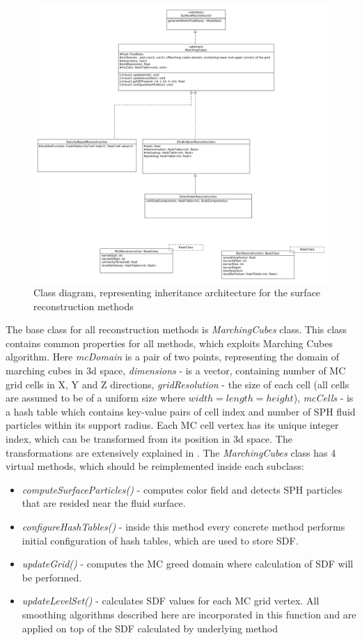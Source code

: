 \begin{figure}[H]
	\begin{center}
		\includegraphics[width=\textwidth]{figures/ClassDiagram.png}
	\end{center}
	\caption{Class diagram, representing inheritance architecture for the surface reconstruction methods}
    \label{fig:class-diagam}
\end{figure}
The base class for all reconstruction methods is \emph{MarchingCubes} class. This class contains common properties for all methods, which exploits Marching Cubes algorithm. Here \emph{mcDomain} is a pair of two points, representing the domain of marching cubes in 3d space, \emph{dimensions} - is a vector, containing number of MC grid cells in X, Y and Z directions, \emph{gridResolution} - the size of each cell (all cells are assumed to be of a uniform size where $width=length=height$), \emph{mcCells} - is a hash table which contains key-value pairs of cell index and number of SPH fluid particles within its support radius. Each MC cell vertex has its unique integer index, which can be transformed from its position in 3d space. The transformations are extensively explained in \cite{Akinchi}. 
The \emph{MarchingCubes} class has 4 virtual methods, which should be reimplemented inside each subclass:
\begin{itemize}
	\item \emph{computeSurfaceParticles()} - computes color field and detects SPH particles that are resided near the fluid surface.
	\item \emph{configureHashTables()} - inside this method every concrete method performs initial configuration of hash tables, which are used to store SDF.
	\item \emph{updateGrid()} - computes the MC greed domain where calculation of SDF will be performed.
	\item \emph{updateLevelSet()} - calculates SDF values for each MC grid vertex. All smoothing algorithms described here are incorporated in this function and are applied on top of the SDF calculated by underlying method 
\end{itemize}

